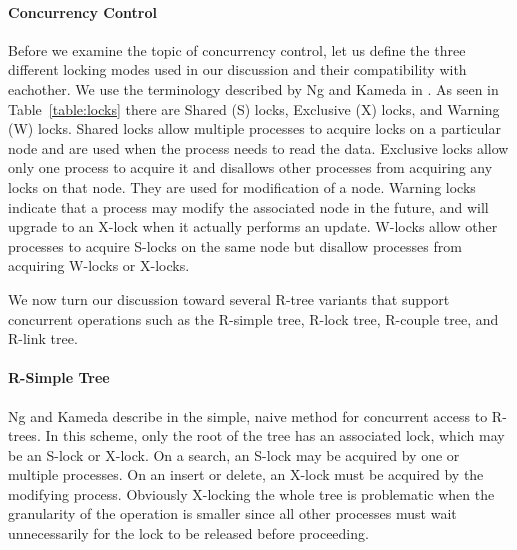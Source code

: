 \paragraph{Concurrency Control} 
Before we examine the topic of concurrency control, let us define the three
different locking modes used in our discussion and their compatibility with
eachother. We use the terminology described by Ng and Kameda in 
\cite{ng1993concurrent}. As seen in Table~\ref{table:locks} there are Shared 
(S) locks, Exclusive (X) locks, and Warning (W) locks. Shared locks allow multiple 
processes to acquire locks on a particular node and are used when the process
needs to read the data. Exclusive locks allow only one process to acquire it
and disallows other processes from acquiring any locks on that node. They are 
used for modification of a node. Warning locks indicate that a process
may modify the associated node in the future, and will upgrade to an X-lock 
when it actually performs an update. W-locks allow other processes to acquire
S-locks on the same node but disallow processes from acquiring W-locks or X-locks.

\begin{table}[hb]
\end{table}
	
We now turn our discussion toward several R-tree variants that support concurrent 
operations such as the R-simple tree, R-lock tree, R-couple 
tree\cite{ng1993concurrent}, and R-link tree\cite{kornacker1995high, ng1994r}. 

\paragraph{R-Simple Tree} Ng and Kameda describe in \cite{ng1993concurrent}
the simple, naive method for concurrent access to R-trees. In this scheme, only 
the root of the tree has an associated lock, which may be an S-lock or X-lock. 
On a search, an S-lock may be acquired by one or 
multiple processes. On an insert or delete, an X-lock must be acquired by the 
modifying process. Obviously X-locking the whole tree is problematic when the 
granularity of the operation is smaller since all other processes must wait 
unnecessarily for the lock to be released before proceeding. 

